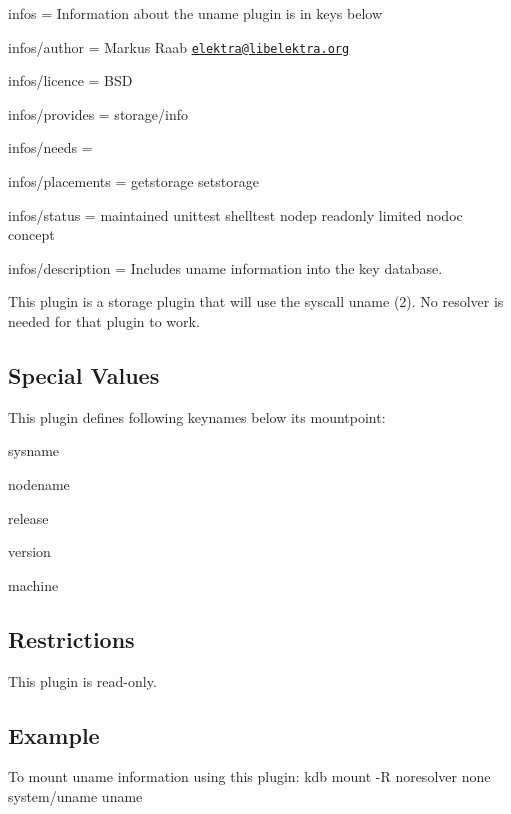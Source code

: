 
\begin{DoxyItemize}
\item infos = Information about the uname plugin is in keys below
\item infos/author = Markus Raab \href{mailto:elektra@libelektra.org}{\tt elektra@libelektra.\+org}
\item infos/licence = B\+S\+D
\item infos/provides = storage/info
\item infos/needs =
\item infos/placements = getstorage setstorage
\item infos/status = maintained unittest shelltest nodep readonly limited nodoc concept
\item infos/description = Includes uname information into the key database.
\end{DoxyItemize}

This plugin is a storage plugin that will use the syscall {\ttfamily uname (2)}. No resolver is needed for that plugin to work.

\subsection*{Special Values}

This plugin defines following keynames below its mountpoint\+:


\begin{DoxyItemize}
\item sysname
\item nodename
\item release
\item version
\item machine
\end{DoxyItemize}

\subsection*{Restrictions}

This plugin is read-\/only.

\subsection*{Example}

To mount uname information using this plugin\+: {\ttfamily kdb mount -\/\+R noresolver none system/uname uname} 